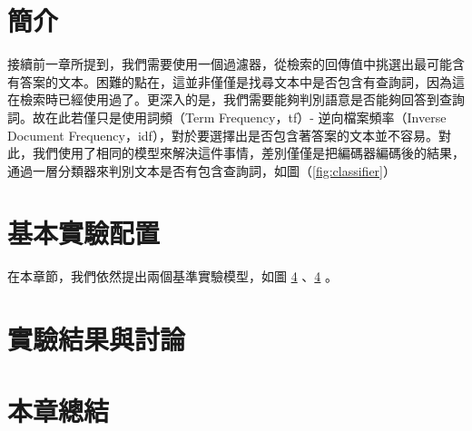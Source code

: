 \section{簡介}
接續前一章所提到，我們需要使用一個過濾器，從檢索的回傳值中挑選出最可能含有答案的文本。困難的點在，這並非僅僅是找尋文本中是否包含有查詢詞，因為這在檢索時已經使用過了。更深入的是，我們需要能夠判別語意是否能夠回答到查詢詞。故在此若僅只是使用詞頻（Term Frequency，tf）- 逆向檔案頻率（Inverse Document Frequency，idf），對於要選擇出是否包含著答案的文本並不容易。對此，我們使用了相同的模型來解決這件事情，差別僅僅是把編碼器編碼後的結果，通過一層分類器來判別文本是否有包含查詢詞，如圖（\ref{fig:classifier}）%

\section{基本實驗配置}
在本章節，我們依然提出兩個基準實驗模型，如圖 \ref{} 、\ref{} 。
\section{實驗結果與討論}
\section{本章總結}

